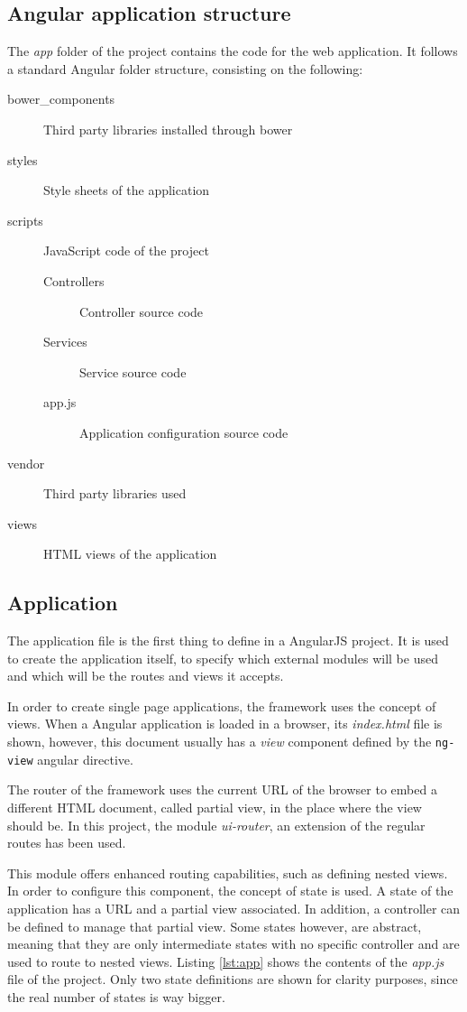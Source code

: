 \subsection{Angular application structure}

The \textit{app} folder of the project contains the code for the web application. It follows a standard Angular folder structure, consisting on the following:

\begin{description}
\item[bower\_components] Third party libraries installed through bower
\item[styles] Style sheets of the application
\item[scripts] JavaScript code of the project
  \begin{description}
  \item[Controllers] Controller source code
  \item[Services] Service source code
  \item[app.js] Application configuration source code 
  \end{description}
\item[vendor] Third party libraries used
\item[views] HTML views of the application
\end{description}

\subsection{Application}

The application file is the first thing to define in a AngularJS project. It is used to create the application itself, to specify which external modules will be used and which will be the routes and views it accepts.

In order to create single page applications, the framework uses the concept of views. When a Angular application is loaded in a browser, its \textit{index.html} file is shown, however, this document usually has a \textit{view} component defined by the \texttt{ng-view} angular directive.

The router of the framework uses the current URL of the browser to embed a different HTML document, called partial view, in the place where the view should be. In this project, the module \textit{ui-router}, an extension of the regular routes has been used.

This module offers enhanced routing capabilities, such as defining nested views. In order to configure this component, the concept of state is used. A state of the application has a URL and a partial view associated. In addition, a controller can be defined to manage that partial view. Some states however, are abstract, meaning that they are only intermediate states with no specific controller and are used to route to nested views. Listing \ref{lst:app} shows the contents of the \textit{app.js} file of the project. Only two state definitions are shown for clarity purposes, since the real number of states is way bigger. 

